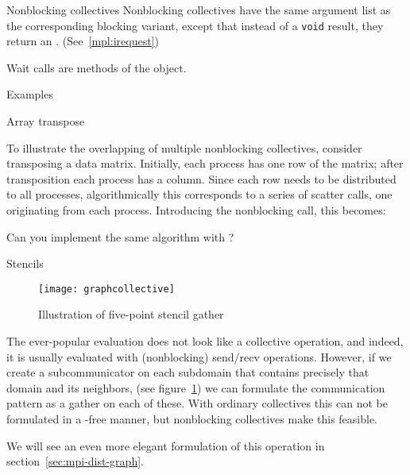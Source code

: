 \begin{mplnote}{Nonblocking collectives}
  Nonblocking collectives have the same argument list as the
  corresponding blocking variant, except that
  instead of a \lstinline+void+ result,
  they return an .
  (See~\ref{mpl:irequest})

  Wait calls are methods of the  object.
\end{mplnote}

 {Examples}

 {Array transpose}

To illustrate the overlapping of multiple nonblocking collectives,
consider transposing a data matrix.
Initially, each process has one row of the matrix;
after transposition each process has a column.
Since each row needs to be distributed to all processes,
algorithmically this corresponds to a series of scatter calls,
one originating from each process.
%
%
Introducing the nonblocking  call,
this becomes:
%

\begin{exercise}
  Can you implement the same algorithm with ?
\end{exercise}


 {Stencils}

\begin{figure}[ht]
  \texttt{[image: graphcollective]}
  \caption{Illustration of five-point stencil gather}
  \label{fig:5ptcollective}
\end{figure}

The ever-popular  evaluation
does not look like a collective operation, and indeed,
it is usually evaluated with (nonblocking) send/recv operations.
However, if we create a subcommunicator on each subdomain
that contains precisely that domain and its neighbors,
(see figure~\ref{fig:5ptcollective})
we can formulate the communication pattern as a gather on each of these.
With ordinary collectives this can not be formulated in a -free
manner, but nonblocking collectives make this feasible.

We will see an even more elegant formulation of this operation
in section~\ref{sec:mpi-dist-graph}.

